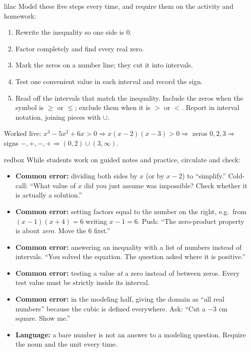 \documentclass[10pt]{article}
\begin{document}
\begin{skillbox}{lilac}
Model these five steps every time, and require them on the activity and
homework:
\begin{enumerate}[itemsep=2pt]
  \item Rewrite the inequality so one side is $0$.
  \item Factor completely and find every real zero.
  \item Mark the zeros on a number line; they cut it into intervals.
  \item Test one convenient value in each interval and record the sign.
  \item Read off the intervals that match the inequality. Include the zeros
        when the symbol is $\ge$ or $\le$; exclude them when it is $>$ or $<$.
        Report in interval notation, joining pieces with $\cup$.
\end{enumerate}
Worked live: $x^3 - 5x^2 + 6x > 0 \Rightarrow x(x-2)(x-3) > 0 \Rightarrow$
zeros $0, 2, 3 \Rightarrow$ signs $-, +, -, + \Rightarrow (0,2) \cup
(3,\infty)$.
\end{skillbox}

\begin{skillbox}{redbox}
While students work on guided notes and practice, circulate and check:
\begin{itemize}
  \item \textbf{Common error:} dividing both sides by $x$ (or by $x - 2$) to
        ``simplify.'' Cold-call: ``What value of $x$ did you just assume was
        impossible? Check whether it is actually a solution.''
  \item \textbf{Common error:} setting factors equal to the number on the
        right, e.g.\ from $(x-1)(x+4) = 6$ writing $x - 1 = 6$. Push: ``The
        zero-product property is about \textit{zero}. Move the 6 first.''
  \item \textbf{Common error:} answering an inequality with a list of numbers
        instead of intervals. ``You solved the equation. The question asked
        where it is positive.''
  \item \textbf{Common error:} testing a value \textit{at} a zero instead of
        between zeros. Every test value must be strictly inside its interval.
  \item \textbf{Common error:} in the modeling half, giving the domain as
        ``all real numbers'' because the cubic is defined everywhere. Ask:
        ``Cut a $-3$ cm square. Show me.''
  \item \textbf{Language:} a bare number is not an answer to a modeling
        question. Require the noun and the unit every time.
\end{itemize}
\end{skillbox}
\end{document}
